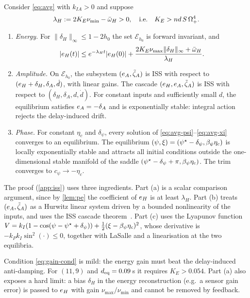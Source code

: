\begin{theorem}\label{thm:iss-avg}
Consider \eqref{eq:avg} with $k_{IA}>0$ and suppose
\begin{equation}\label{eq:gain-cond}
  \lambda_H:=2K_E\nu_{\min}-\bar\omega_H>0,
  \quad\text{i.e.}\quad K_E>nd\,S\,\Omega_+^4 .
\end{equation}
\begin{enumerate}
\item[(a)] \emph{Energy.} For $\|\delta_H\|_\infty\le1-2h_0$ the set
  $\mathcal E_{h_0}$ is forward invariant, and
  \begin{equation}\label{eq:iss-H}
    |e_H(t)|\le e^{-\lambda_Ht}|e_H(0)|
      +\frac{2K_E\nu_{\max}\|\delta_H\|_\infty+\bar\omega_H}{\lambda_H}.
  \end{equation}
\item[(b)] \emph{Amplitude.} On $\mathcal E_{h_0}$, the subsystem
  $(e_A,\tilde\zeta_A)$ is ISS with respect to $(e_H+\delta_H,\delta_A,\dot
  d)$, with linear gains.
  The cascade $(e_H,e_A,\tilde\zeta_A)$ is ISS with respect to
  $(\delta_H,\delta_A,d,\dot d)$.
  For constant inputs and sufficiently small $d$, the equilibrium satisfies
  $e_A=-\delta_A$ and is exponentially stable: integral action rejects the
  delay-induced drift.
\item[(c)] \emph{Phase.} For constant $\eta_c$ and $\delta_\psi$, every
  solution of \eqref{eq:avg-psi}--\eqref{eq:avg-xi} converges to an equilibrium.
  The equilibrium $(\psi,\xi)=(\psi^\star-\delta_\psi,\beta_\psi\eta_c)$ is locally
  exponentially stable and attracts all initial conditions outside the
  one-dimensional stable manifold of the saddle
  $(\psi^\star-\delta_\psi+\pi,\beta_\psi\eta_c)$.
  The trim converges to $c_\psi\to-\eta_c$.
\end{enumerate}
\end{theorem}

The proof (\cref{app:iss}) uses three ingredients.
Part (a) is a scalar comparison argument, since by \cref{lem:pe} the
coefficient of $e_H$ is at least $\lambda_H$.
Part (b) treats $(e_A,\tilde\zeta_A)$ as a Hurwitz linear system driven by a
bounded nonlinearity of the inputs, and uses the ISS cascade
theorem~\citep{sontag1989smooth}.
Part (c) uses the Lyapunov function
$V=k_I(1-\cos(\psi-\psi^\star+\delta_\psi))+\tfrac12(\xi-\beta_\psi\eta_c)^2$,
whose derivative is $-k_Pk_I\sin^2(\cdot)\le0$, together with LaSalle and a
linearisation at the two equilibria.

Condition \eqref{eq:gain-cond} is mild: the energy gain must beat the
delay-induced anti-damping.
For $(11,9)$ and $d_{\mathrm{eq}}=0.09$\,s it requires $K_E>0.054$.
Part (a) also exposes a hard limit: a bias $\delta_H$ in the energy
reconstruction (e.g.\ a sensor gain error) is passed to $e_H$ with gain
$\nu_{\max}/\nu_{\min}$ and cannot be removed by feedback.

